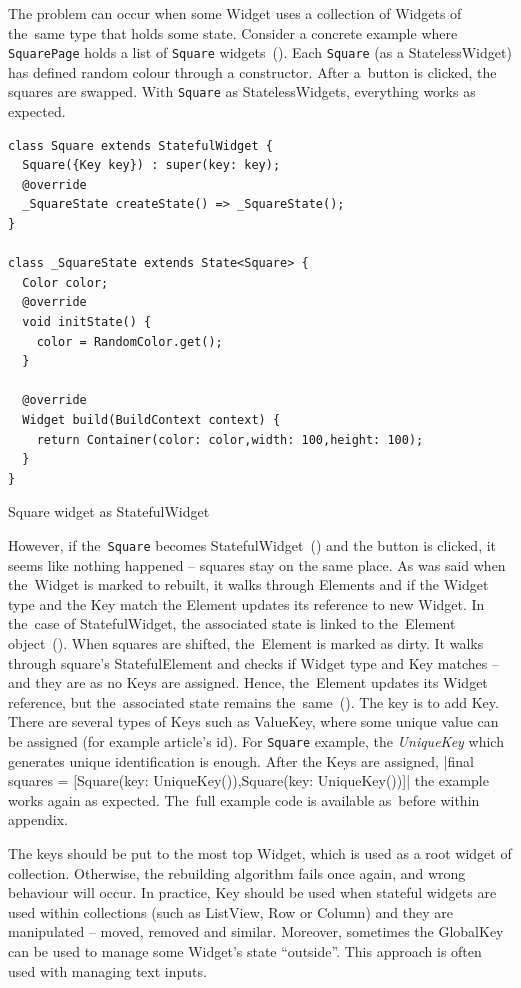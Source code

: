 The problem can occur when some Widget uses a collection of Widgets of the~same type that holds some state.  Consider a concrete example where \verb|SquarePage| holds a list of \verb|Square| widgets~(). Each \verb|Square| (as a StatelessWidget) has defined random colour through a constructor. After a~button is clicked, the squares are swapped. With \verb|Square| as StatelessWidgets, everything works as expected. 

\begin{listing}[ht]
\begin{verbatim}
class Square extends StatefulWidget {
  Square({Key key}) : super(key: key);
  @override
  _SquareState createState() => _SquareState();
}

class _SquareState extends State<Square> {
  Color color;
  @override
  void initState() {
    color = RandomColor.get();
  }

  @override
  Widget build(BuildContext context) {
    return Container(color: color,width: 100,height: 100);
  }
}
\end{verbatim}
\caption{Square widget as StatefulWidget}
\label{listing:keys_square_stateful}
\end{listing}

However, if the~\verb|Square| becomes StatefulWidget~() and the button is clicked, it seems like nothing happened -- squares stay on the same place. As was said when the~Widget is marked to rebuilt, it walks through Elements and if the Widget type and the Key match the Element updates its reference to new Widget. In the~case of StatefulWidget, the associated state is linked to the~Element object~(). When squares are shifted, the~Element is marked as dirty. It walks through square's StatefulElement and checks if Widget type and Key matches -- and they are as no Keys are assigned. Hence, the~Element updates its Widget reference, but the~associated state remains the~same~(). 
The key is to add Key. There are several types of Keys such as ValueKey, where some unique value can be assigned (for example article's id). For \verb|Square| example, the \textit{UniqueKey} which generates unique identification is enough.  After the Keys are assigned, |final squares = [Square(key: UniqueKey()),Square(key: UniqueKey())]| the example works again as expected. The~full example code is available as~before within appendix.

The keys should be put to the most top Widget, which is used as a root widget of collection. Otherwise, the rebuilding algorithm fails once again, and wrong behaviour will occur. In practice, Key should be used when stateful widgets are used within collections (such as ListView, Row or Column) and they are manipulated -- moved, removed and similar.  Moreover, sometimes the GlobalKey can be used to manage some Widget's state ``outside''. This approach is often used with managing text inputs. 

